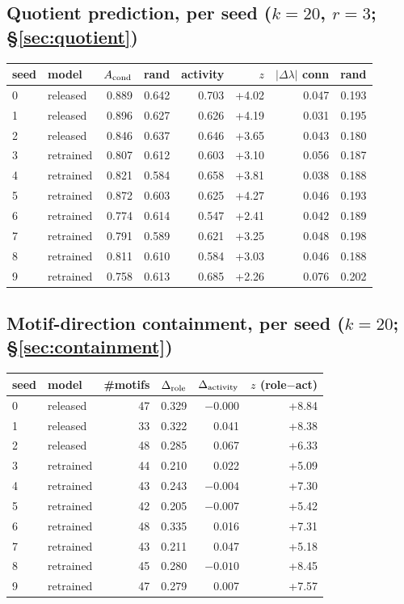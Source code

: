 \documentclass[11pt]{article}
\begin{document}
\subsection{Quotient prediction, per seed ($k=20$, $r=3$; \S\ref{sec:quotient})}
\begin{center}\small
\begin{tabular}{llrrrrrr}
\toprule
seed & model & $A_{\rm cond}$ & rand & activity & $z$ & $|\Delta\lambda|$ conn & rand \\
\midrule
0 & released & 0.889 & 0.642 & 0.703 & +4.02 & 0.047 & 0.193 \\
1 & released & 0.896 & 0.627 & 0.626 & +4.19 & 0.031 & 0.195 \\
2 & released & 0.846 & 0.637 & 0.646 & +3.65 & 0.043 & 0.180 \\
3 & retrained & 0.807 & 0.612 & 0.603 & +3.10 & 0.056 & 0.187 \\
4 & retrained & 0.821 & 0.584 & 0.658 & +3.81 & 0.038 & 0.188 \\
5 & retrained & 0.872 & 0.603 & 0.625 & +4.27 & 0.046 & 0.193 \\
6 & retrained & 0.774 & 0.614 & 0.547 & +2.41 & 0.042 & 0.189 \\
7 & retrained & 0.791 & 0.589 & 0.621 & +3.25 & 0.048 & 0.198 \\
8 & retrained & 0.811 & 0.610 & 0.584 & +3.03 & 0.046 & 0.188 \\
9 & retrained & 0.758 & 0.613 & 0.685 & +2.26 & 0.076 & 0.202 \\
\bottomrule
\end{tabular}
\end{center}

\subsection{Motif-direction containment, per seed ($k=20$; \S\ref{sec:containment})}
\begin{center}\small
\begin{tabular}{llrrrr}
\toprule
seed & model & \#motifs & $\Delta_{\rm role}$ & $\Delta_{\rm activity}$ & $z$ (role$-$act) \\
\midrule
0 & released & 47 & 0.329 & $-0.000$ & +8.84 \\
1 & released & 33 & 0.322 & 0.041 & +8.38 \\
2 & released & 48 & 0.285 & 0.067 & +6.33 \\
3 & retrained & 44 & 0.210 & 0.022 & +5.09 \\
4 & retrained & 43 & 0.243 & $-0.004$ & +7.30 \\
5 & retrained & 42 & 0.205 & $-0.007$ & +5.42 \\
6 & retrained & 48 & 0.335 & 0.016 & +7.31 \\
7 & retrained & 43 & 0.211 & 0.047 & +5.18 \\
8 & retrained & 45 & 0.280 & $-0.010$ & +8.45 \\
9 & retrained & 47 & 0.279 & 0.007 & +7.57 \\
\bottomrule
\end{tabular}
\end{center}
\end{document}
